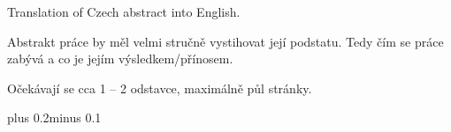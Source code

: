 \documentclass[11pt,twoside,a4paper]{book}
\begin{document}
	
	\coverpagestarts
	
	
	
	
	
	
	
	
	\abstractpage
	
	Translation of Czech abstract into English.
	
	
	\baselineskip
	
	\noindent
	Abstrakt práce by měl velmi stručně vystihovat její podstatu. Tedy čím se práce zabývá a co je jejím výsledkem/přínosem.
	
	\noindent
	Očekávají se cca 1 -- 2 odstavce, maximálně půl stránky.
	
	
	\tableofcontents
	
	
	
	\listoffigures
	
	
	
	\listoftables
	
	
	
	\mainbodystarts
	\normalfont
	\baselineskip plus 0.2\baselineskip minus 0.1\baselineskip
	
	
	
\end{document}
